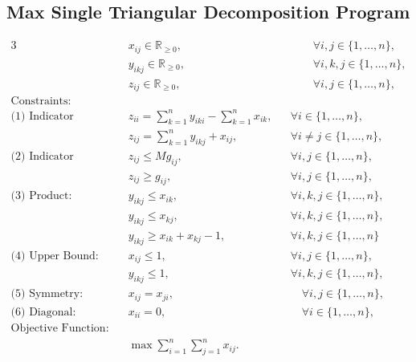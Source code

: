 \documentclass[11pt]{article}
\begin{document}
\subsection{Max Single Triangular Decomposition Program} \label{subsec::max_STP_program}

\begin{alignat}{3}
& x_{ij} \in  \mathbb{R}_{\geq 0}, 
&&\qquad \forall i,j \in \{1, \dots, n\}, \label{eq::max_STP_x_variable} \\
& y_{ikj} \in \mathbb{R}_{\geq 0}, 
&&\qquad \forall i,k,j \in \{1, \dots, n\}, \label{eq::max_STP_y_variable} \\
& z_{ij} \in \mathbb{R}_{\geq 0}, 
&&\qquad \forall i,j \in \{1, \dots, n\}, \label{eq::max_STP_z_variable} \\
\text{Constraints: } & \nonumber \\
\text{(1) Indicator argument: } 
& z_{ii} = \sum_{k = 1}^{n}y_{iki} - \sum_{k = 1}^{n} x_{ik}, 
&& \forall i \in \{1, \dots, n\} , \label{eq::max_STP_fund_matrix} \\
& z_{ij} = \sum_{k = 1}^{n}y_{ikj} + x_{ij}, 
&& \forall i \neq j \in \{1, \dots, n\} , \label{eq::max_STP_indicator_arg} \\
\text{(2) Indicator function: } 
& z_{ij} \leq M g_{ij}, 
&& \forall i, j \in \{1, \dots, n\}, \label{eq::max_STP_indicator_upper} \\
& z_{ij} \geq g_{ij}, 
&& \forall i, j \in \{1, \dots, n\}, \label{eq::max_STP_indicator_lower}\\
\text{(3) Product: } 
& y_{ikj} \leq x_{ik}, 
&& \forall i, k, j \in \{1, \dots, n\}, \label{eq::max_STP_product_upper_first} \\
& y_{ikj} \leq x_{kj}, 
&& \forall i, k, j \in \{1, \dots, n\}, \label{eq::max_STP_product_upper_second} \\
& y_{ikj} \geq x_{ik} + x_{kj} - 1, 
&& \forall i, k, j \in \{1, \dots, n\} \label{eq::max_STP_product_lower} \\
\text{(4) Upper Bound: } 
& x_{ij} \leq 1, 
&& \forall i, j \in \{1, \dots, n\}, \label{eq::max_STP_x_upper_bound} \\
& y_{ikj} \leq 1, 
&& \forall i, k, j \in \{1, \dots, n\}, \label{eq::max_STP_y_upper_bound} \\
\text{(5) Symmetry: } 
& x_{ij} = x_{ji}, 
&&\quad \forall i,j \in \{1, \dots, n\}, \label{eq::max_STP_symmetry_x} \\
\text{(6) Diagonal: } 
& x_{ii} = 0, 
&&\quad \forall i \in \{1, \dots, n\},  \label{eq::max_STP_diagonal_x} \\
\text{Objective Function: } & \nonumber \\ 
& \max \sum_{i=1}^{n} \sum_{j=1}^{n} x_{ij}. \label{eq::max_STP_objective_funtion}
\end{alignat} \label{eq::max_STP_program}
\end{document}
